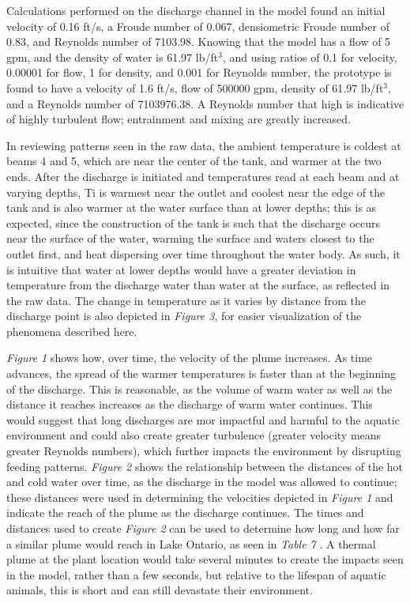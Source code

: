 \documentclass{article}
\begin{document}
\par Calculations performed on the discharge channel in the model found an initial velocity of 0.16 ft/s, a Froude number of 0.067, densiometric Froude number of 0.83, and Reynolds number of 7103.98. Knowing that the model has a flow of 5 gpm, and the density of water is 61.97 lb/ft$^3$, and using ratios of 0.1 for velocity, 0.00001 for flow, 1 for density, and 0.001 for Reynolds number, the prototype is found to have a velocity of 1.6 ft/s, flow of 500000 gpm, density of 61.97 lb/ft$^3$, and a Reynolds number of 7103976.38.  A Reynolds number that high is indicative of highly turbulent flow; entrainment and mixing are greatly increased.  
\par In reviewing patterns seen in the raw data, the ambient temperature is coldest at beams 4 and 5, which are near the center of the tank, and warmer at the two ends. After the discharge is initiated and temperatures read at each beam and at varying depths, Ti is warmest near the outlet and coolest near the edge of the tank and is also warmer at the water surface than at lower depths; this is as expected, since the construction of the tank is such that the discharge occurs near the surface of the water, warming the surface and waters closest to the outlet first, and heat dispersing over time throughout the water body. As such, it is intuitive that water at lower depths would have a greater deviation in temperature from the discharge water than water at the surface, as reflected in the raw data. The change in temperature as it varies by distance from the discharge point is also depicted in \emph{Figure 3}, for easier visualization of the phenomena described here.  
\par \emph{Figure 1} shows how, over time, the velocity of the plume increases. As time advances, the spread of the warmer temperatures is faster than at the beginning of the discharge. This is reasonable, as the volume of warm water as well as the distance it reaches increases as the discharge of warm water continues. This would suggest that long discharges are mor impactful and harmful to the aquatic environment and could also create greater turbulence (greater velocity means greater Reynolds numbers), which further impacts the environment by disrupting feeding patterns. \emph{Figure 2} shows the relationship between the distances of the hot and cold water over time, as the discharge in the model was allowed to continue; these distances were used in determining the velocities depicted in \emph{Figure 1} and indicate the reach of the plume as the discharge continues. The times and distances used to create \emph{Figure 2} can be used to determine how long and how far a similar plume would reach in Lake Ontario, as seen in \emph{Table 7} . A thermal plume at the plant location would take several minutes to create the impacts seen in the model, rather than a few seconds, but relative to the lifespan of aquatic animals, this is short and can still devastate their environment.  
\end{document}
